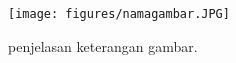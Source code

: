 \begin{figure}[!htbp]
    \texttt{[image: figures/namagambar.JPG]}
    \caption{penjelasan keterangan gambar.}
    \label{labelgambar}
\end{figure}